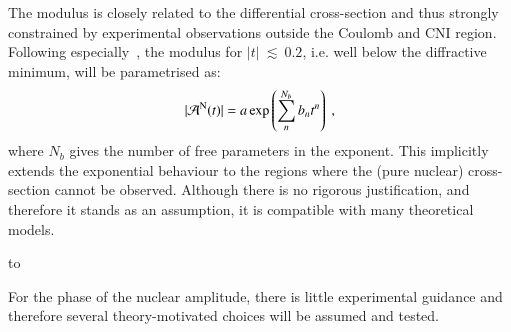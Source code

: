 The modulus is closely related to the differential cross-section and thus strongly constrained by experimental observations outside the Coulomb and CNI region. Following especially~\cite{8tev-90m}, the modulus for $|t|~\lesssim~0.2$, i.e. well below the diffractive minimum, will be parametrised as:
\begin{equation}
\label{eq:nuc mod}
| {\cal A}^{\rm N}(t) | = a \exp\left( \sum\limits_{n}^{N_b} b_n t^n \right)\ ,
\end{equation}
where $N_b$ gives the number of free parameters in the exponent. This implicitly extends the exponential behaviour to the regions where the (pure nuclear) cross-section cannot be observed. Although there is no rigorous justification, and therefore it stands as an assumption, it is compatible with many theoretical models.




\vskip3mm
\hbox to

For the phase of the nuclear amplitude, there is little experimental guidance and therefore several theory-motivated choices will be assumed and tested.

